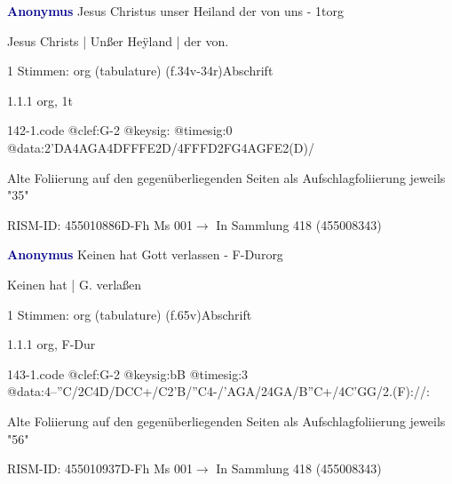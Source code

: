 \documentclass[twocolumn, 12pt]{book}
\begin{document}
\par \vspace{16pt} \textcolor{darkblue}{\textbf{Anonymus  }}\hfillplus{\textbf{[142]}}\newline Jesus Christus unser Heiland der von uns - 1t\newline org
\par \begin{itshape}[f.35r, at left:] Jesus Christs | Unßer Heÿland | der von.\end{itshape} 
\par \textcolor{darkblue}{}  1 Stimmen: org (tabulature)  (f.34v-34r)\newline Abschrift
\par 1.1.1  org, 1t  
\begin{filecontents*}{142-1.code}
@clef:G-2
@keysig:
@timesig:0
@data:2'DA4AGA4DFFFE2D/4FFFD2FG4AGFE2(D)/
\end{filecontents*}
\newline %
\par Alte Foliierung auf den gegenüberliegenden Seiten als Aufschlagfoliierung jeweils "35"
\par RISM-ID: 455010886\newline D-Fh  Ms 001\newline $\rightarrow$ In Sammlung 418 (455008343)
      
\par \vspace{16pt} \textcolor{darkblue}{\textbf{Anonymus  }}\hfillplus{\textbf{[143]}}\newline Keinen hat Gott verlassen - F-Dur\newline org
\par \begin{itshape}[f.65v, at left:] Keinen hat | G. verlaßen\end{itshape} 
\par \textcolor{darkblue}{}  1 Stimmen: org (tabulature)  (f.65v)\newline Abschrift
\par 1.1.1  org, F-Dur  
\begin{filecontents*}{143-1.code}
@clef:G-2
@keysig:bB
@timesig:3
@data:4--''C/2C4D/DCC+/C2'B/''C4-/'AGA/24GA/B''C+/4C'GG/2.(F)://:
\end{filecontents*}
\newline %
\par Alte Foliierung auf den gegenüberliegenden Seiten als Aufschlagfoliierung jeweils "56"
\par RISM-ID: 455010937\newline D-Fh  Ms 001\newline $\rightarrow$ In Sammlung 418 (455008343)
      
\end{document}
